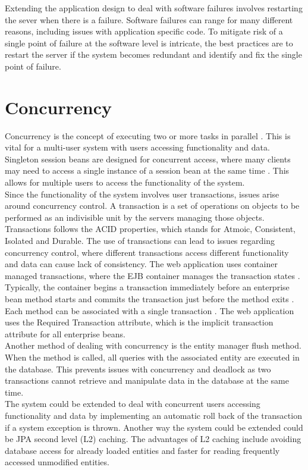 \documentclass{article}
\begin{document}
Extending the application design to deal with software failures involves restarting the sever when there is a failure. Software failures can range for many different reasons, including issues with application specific code. To mitigate risk of a single point of failure at the software level is intricate, the best practices are to restart the server if the system becomes redundant and identify and fix the single point of failure.

\newpage

\section{Concurrency}

Concurrency is the concept of executing two or more tasks in parallel \cite{concurrency}. This is vital for a multi-user system with users accessing functionality and data. Singleton session beans are designed for concurrent access, where many clients may need to access a single instance of a session bean at the same time \cite{concurrencybean}. This allows for multiple users to access the functionality of the system. \\

Since the functionality of the system involves user transactions, issues arise around concurrency control. A transaction  is a set of operations on objects to be performed as an indivisible unit by the servers managing those objects. Transactions follows the ACID properties, which stands for Atmoic, Consistent, Isolated and Durable. The use of transactions can lead to issues regarding concurrency control, where different transactions access different functionality and data can cause lack of consistency. The web application uses container managed transactions, where the EJB container manages the transaction states \cite{transactions}. Typically, the container begins a transaction immediately before an enterprise bean method starts and commits the transaction just before the method exits \cite{transactions}. Each method can be associated with a single transaction \cite{transactions}. The web application uses the Required Transaction attribute, which is the implicit transaction attribute for all enterprise beans. \\

Another method of dealing with concurrency is the entity manager flush method. When the method is called, all queries with the associated entity are executed in the database. This prevents issues with concurrency and deadlock as two transactions cannot retrieve and manipulate data in the database at the same time.\\

The system could be extended to deal with concurrent users accessing functionality and data by implementing an automatic roll back of the transaction if a system exception is thrown. Another way the system could be extended could be JPA second level (L2) caching. The advantages of L2 caching include avoiding database access for already loaded entities and faster for reading frequently accessed unmodified entities.

\newpage



\newpage
\end{document}
